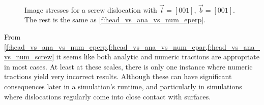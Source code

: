 \documentclass[11pt]{iopart}
\begin{document}
\begin{figure}
    ~
    ~
    \caption{Image stresses for a screw dislocation with $\vec{l} = [0 0 1]$, $\vec{b} = [0 0 1]$. The rest is the same as \cref{f:head_vs_ana_vs_num_eperp}.}
    \label{f:head_vs_ana_vs_num_screw}
\end{figure}

From \cref{f:head_vs_ana_vs_num_eperp,f:head_vs_ana_vs_num_epar,f:head_vs_ana_vs_num_screw} it seems
like both analytic and numeric tractions are appropriate in most cases. At least at these scales, there is only one instance where numeric tractions yield very incorrect results. Although these can have significant consequences later in a simulation's runtime, and particularly in simulations where dislocations regularly come into close contact with surfaces.
\end{document}
